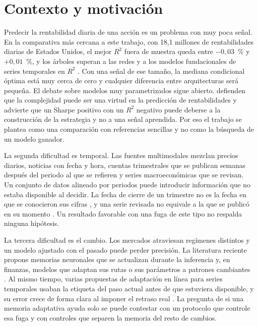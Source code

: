 \documentclass[11pt,a4paper]{report}
\begin{document}
\section{Contexto y motivación}
Predecir la rentabilidad diaria de una acción es un problema con muy poca señal.
En la comparativa más cercana a este trabajo, con 18,1 millones de
rentabilidades diarias de Estados Unidos, el mejor $R^2$ fuera de muestra queda
entre $-0{,}03$~\% y $+0{,}01$~\%, y los árboles superan a las redes y a los
modelos fundacionales de series temporales en $R^2$
\parencite{rahimikia2025tsfmfinance}.
Con una señal de ese tamaño, la mediana condicional óptima está muy cerca de
cero y cualquier diferencia entre arquitecturas será pequeña. El debate sobre
modelos muy parametrizados sigue abierto. \textcite{kelly2024virtue} defienden
que la complejidad puede ser una virtud en la predicción de rentabilidades y
\textcite{nagel2025seemingly} advierte que un Sharpe positivo con un $R^2$
negativo puede deberse a la construcción de la estrategia y no a una señal
aprendida. Por eso el trabajo se plantea como una comparación con referencias
sencillas y no como la búsqueda de un modelo ganador.

La segunda dificultad es temporal. Las fuentes multimodales mezclan precios
diarios, noticias con fecha y hora, cuentas trimestrales que se publican
semanas después del periodo al que se refieren y series macroeconómicas que se
revisan. Un conjunto de datos alineado por periodos puede introducir
información que no estaba disponible al decidir. La fecha de cierre de un
trimestre no es la fecha en que se conocieron sus cifras
\parencite{sec_edgar_timestamps}, y una serie revisada no equivale a la que se
publicó en su momento \parencite{alfred_vintages}. Un resultado favorable con
una fuga de este tipo no respalda ninguna hipótesis.

La tercera dificultad es el cambio. Los mercados atraviesan regímenes distintos
y un modelo ajustado con el pasado puede perder precisión. La literatura
reciente propone memorias neuronales que se actualizan durante la inferencia
\parencite{behrouz2025titans,sun2025ttt} y, en finanzas, modelos que adaptan
sus rutas o sus parámetros a patrones cambiantes
\parencite{lin2021tra,zhao2023doubleadapt}. Al mismo tiempo, varias
propuestas de adaptación en línea para series temporales usaban la etiqueta
del paso actual antes de que estuviera disponible, y su error crece de forma
clara al imponer el retraso real \parencite{zhao2025proceed,lau2025dsof}.
La pregunta de si una memoria adaptativa ayuda solo se puede contestar con un
protocolo que controle esa fuga y con controles que separen la memoria del
resto de cambios.
\end{document}
